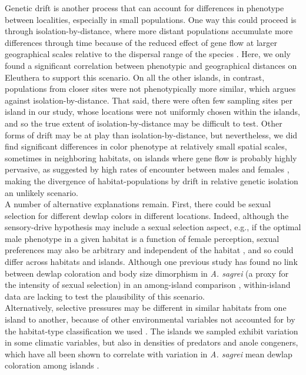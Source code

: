 Genetic drift is another process that can account for differences in phenotype between localities, especially in small populations. One way this could proceed is through isolation-by-distance, where more distant populations accumulate more differences through time because of the reduced effect of gene flow at larger geographical scales relative to the dispersal range of the species \citep{Rousset2004}. Here, we only found a significant correlation between phenotypic and geographical distances on Eleuthera to support this scenario. On all the other islands, in contrast, populations from closer sites were not phenotypically more similar, which argues against isolation-by-distance. That said, there were often few sampling sites per island in our study, whose locations were not uniformly chosen within the islands, and so the true extent of isolation-by-distance may be difficult to test. Other forms of drift may be at play than isolation-by-distance, but nevertheless, we did find significant differences in color phenotype at relatively small spatial scales, sometimes in neighboring habitats, on islands where gene flow is probably highly pervasive, as suggested by high rates of encounter between males and females \citep{Kamath2018}, making the divergence of habitat-populations by drift in relative genetic isolation an unlikely scenario.\\

A number of alternative explanations remain. First, there could be sexual selection for different dewlap colors in different locations. Indeed, although the sensory-drive hypothesis may include a sexual selection aspect, e.g., if the optimal male phenotype in a given habitat is a function of female perception, sexual preferences may also be arbitrary and independent of the habitat \citep{Andersson1994}, and so could differ across habitats and islands. Although one previous study has found no link between dewlap coloration and body size dimorphism in \textit{A. sagrei} (a proxy for the intensity of sexual selection) in an among-island comparison \citep{Baeckens2018}, within-island data are lacking to test the plausibility of this scenario.\\

Alternatively, selective pressures may be different in similar habitats from one island to another, because of other environmental variables not accounted for by the habitat-type classification we used \citep{Howard1950, Schoener1968}. The islands we sampled exhibit variation in some climatic variables, but also in densities of predators and anole congeners, which have all been shown to correlate with variation in \textit{A. sagrei} mean dewlap coloration among islands \citep{Vanhooydonck2009, Baeckens2018}.\\

